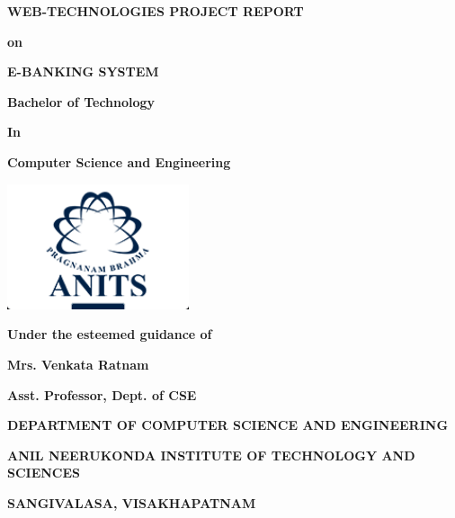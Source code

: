 \begin{titlepage}
    \centering
    {\fontsize{24}{28}\selectfont\bfseries WEB-TECHNOLOGIES PROJECT REPORT\par}
    \vspace{0.3cm}
    {\fontsize{18}{22}\selectfont\bfseries on\par}
    \vspace{0.3cm}
    {\fontsize{24}{28}\selectfont\bfseries E-BANKING SYSTEM\par}
    \vspace{1cm}
    {\fontsize{18}{22}\selectfont\bfseries Bachelor of Technology\par}
    \vspace{0.1cm}
    {\fontsize{18}{22}\selectfont\bfseries In\par}
    \vspace{0.1cm}
    {\fontsize{18}{22}\selectfont\bfseries Computer Science and Engineering\par}
    \includegraphics[width=0.4\textwidth]{anits_logo.png}\par
    \vspace{1cm}
    {\fontsize{18}{22}\selectfont\bfseries Under the esteemed guidance of\par}
    \vspace{0.2cm}
    {\fontsize{18}{22}\selectfont\bfseries Mrs. Venkata Ratnam\par}
    \vspace{0.2cm}
    {\fontsize{18}{22}\selectfont\bfseries Asst. Professor, Dept. of CSE\par}
    \vspace{1cm}
    {\fontsize{18}{22}\selectfont\bfseries DEPARTMENT OF COMPUTER SCIENCE AND ENGINEERING\par}
    \vspace{0.3cm}
    {\fontsize{18}{22}\selectfont\bfseries ANIL NEERUKONDA INSTITUTE OF TECHNOLOGY AND SCIENCES\par}
    \vspace{0.3cm}
    {\fontsize{18}{22}\selectfont\bfseries SANGIVALASA, VISAKHAPATNAM\par}
\end{titlepage}

